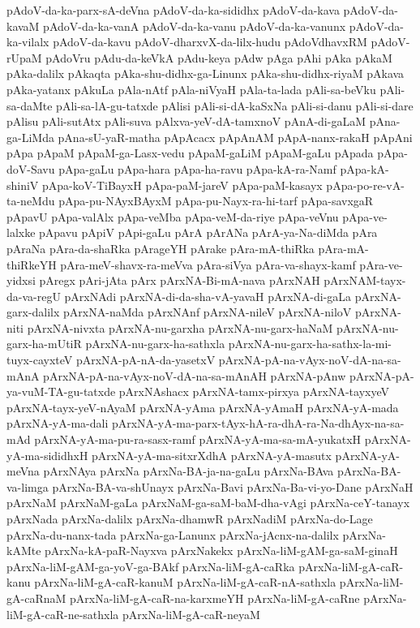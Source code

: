 {pAdoV-da-ka-parx-sA-deVna
pAdoV-da-ka-sididhx
pAdoV-da-kava
pAdoV-da-kavaM
pAdoV-da-ka-vanA
pAdoV-da-ka-vanu
pAdoV-da-ka-vanunx
pAdoV-da-ka-vilalx
pAdoV-da-kavu
pAdoV-dharxvX-da-lilx-hudu
pAdoVdhavxRM
pAdoV-rUpaM
pAdoVru
pAdu-da-keVkA
pAdu-keya
pAdw
pAga
pAhi
pAka
pAkaM
pAka-dalilx
pAkaqta
pAka-shu-didhx-ga-Linunx
pAka-shu-didhx-riyaM
pAkava
pAka-yatanx
pAkuLa
pAla-nAtf
pAla-niVyaH
pAla-ta-lada
pAli-sa-beVku
pAli-sa-daMte
pAli-sa-lA-gu-tatxde
pAlisi
pAli-si-dA-kaSxNa
pAli-si-danu
pAli-si-dare
pAlisu
pAli-sutAtx
pAli-suva
pAlxva-yeV-dA-tamxnoV
pAnA-di-gaLaM
pAna-ga-LiMda
pAna-sU-yaR-matha
pApAcacx
pApAnAM
pApA-nanx-rakaH
pApAni
pApa
pApaM
pApaM-ga-Lasx-vedu
pApaM-gaLiM
pApaM-gaLu
pApada
pApa-doV-Savu
pApa-gaLu
pApa-hara
pApa-ha-ravu
pApa-kA-ra-Namf
pApa-kA-shiniV
pApa-koV-TiBayxH
pApa-paM-jareV
pApa-paM-kasayx
pApa-po-re-vA-ta-neMdu
pApa-pu-NAyxBAyxM
pApa-pu-Nayx-ra-hi-tarf
pApa-savxgaR
pApavU
pApa-valAlx
pApa-veMba
pApa-veM-da-riye
pApa-veVnu
pApa-ve-lalxke
pApavu
pApiV
pApi-gaLu
pArA
pArANa
pArA-ya-Na-diMda
pAra
pAraNa
pAra-da-shaRka
pArageYH
pArake
pAra-mA-thiRka
pAra-mA-thiRkeYH
pAra-meV-shavx-ra-meVva
pAra-siVya
pAra-va-shayx-kamf
pAra-ve-yidxsi
pAregx
pAri-jAta
pArx
pArxNA-Bi-mA-nava
pArxNAH
pArxNAM-tayx-da-va-regU
pArxNAdi
pArxNA-di-da-sha-vA-yavaH
pArxNA-di-gaLa
pArxNA-garx-dalilx
pArxNA-naMda
pArxNAnf
pArxNA-nileV
pArxNA-niloV
pArxNA-niti
pArxNA-nivxta
pArxNA-nu-garxha
pArxNA-nu-garx-haNaM
pArxNA-nu-garx-ha-mUtiR
pArxNA-nu-garx-ha-sathxla
pArxNA-nu-garx-ha-sathx-la-mi-tuyx-cayxteV
pArxNA-pA-nA-da-yasetxV
pArxNA-pA-na-vAyx-noV-dA-na-sa-mAnA
pArxNA-pA-na-vAyx-noV-dA-na-sa-mAnAH
pArxNA-pAnw
pArxNA-pA-ya-vuM-TA-gu-tatxde
pArxNAshacx
pArxNA-tamx-pirxya
pArxNA-tayxyeV
pArxNA-tayx-yeV-nAyaM
pArxNA-yAma
pArxNA-yAmaH
pArxNA-yA-mada
pArxNA-yA-ma-dali
pArxNA-yA-ma-parx-tAyx-hA-ra-dhA-ra-Na-dhAyx-na-sa-mAd
pArxNA-yA-ma-pu-ra-sasx-ramf
pArxNA-yA-ma-sa-mA-yukatxH
pArxNA-yA-ma-sididhxH
pArxNA-yA-ma-sitxrXdhA
pArxNA-yA-masutx
pArxNA-yA-meVna
pArxNAya
pArxNa
pArxNa-BA-ja-na-gaLu
pArxNa-BAva
pArxNa-BA-va-limga
pArxNa-BA-va-shUnayx
pArxNa-Bavi
pArxNa-Ba-vi-yo-Dane
pArxNaH
pArxNaM
pArxNaM-gaLa
pArxNaM-ga-saM-baM-dha-vAgi
pArxNa-ceY-tanayx
pArxNada
pArxNa-dalilx
pArxNa-dhamwR
pArxNadiM
pArxNa-do-Lage
pArxNa-du-nanx-tada
pArxNa-ga-Lanunx
pArxNa-jAcnx-na-dalilx
pArxNa-kAMte
pArxNa-kA-paR-Nayxva
pArxNakekx
pArxNa-liM-gAM-ga-saM-ginaH
pArxNa-liM-gAM-ga-yoV-ga-BAkf
pArxNa-liM-gA-caRka
pArxNa-liM-gA-caR-kanu
pArxNa-liM-gA-caR-kanuM
pArxNa-liM-gA-caR-nA-sathxla
pArxNa-liM-gA-caRnaM
pArxNa-liM-gA-caR-na-karxmeYH
pArxNa-liM-gA-caRne
pArxNa-liM-gA-caR-ne-sathxla
pArxNa-liM-gA-caR-neyaM
}
